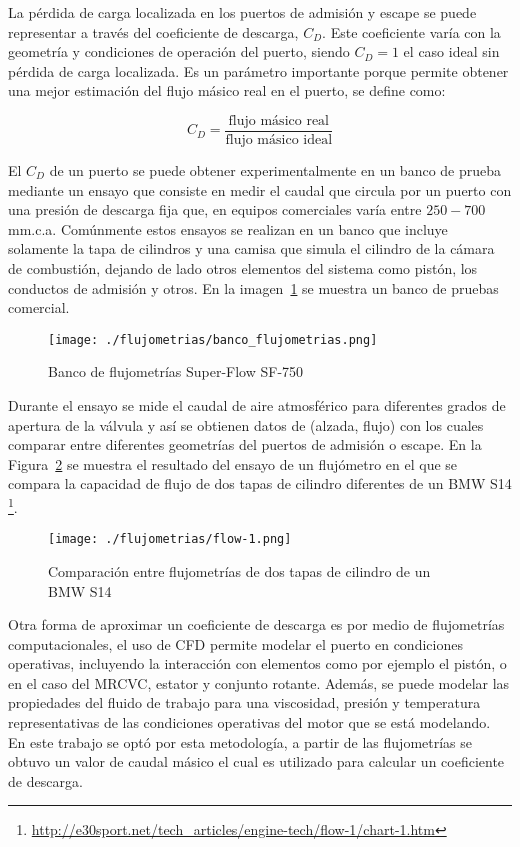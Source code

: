 La pérdida de carga localizada en los puertos de admisión y escape se puede
representar a través del coeficiente de descarga, $C_{D}$.
%
Este coeficiente varía con la geometría y condiciones de operación del puerto,
siendo $C_{D}=1$ el caso ideal sin pérdida de carga localizada.
%
Es un parámetro importante porque permite obtener una mejor estimación del flujo
másico real en el puerto, se define como:

\begin{equation}
  C_{D} = \frac{\text{flujo másico real}}{\text{flujo másico ideal}}
\end{equation}

El $C_{D}$ de un puerto se puede obtener experimentalmente en un banco de prueba
mediante un ensayo que consiste en medir el caudal que circula por un puerto con
una presión de descarga fija que, en equipos comerciales varía entre $250-700$
mm.c.a.
%
Comúnmente estos ensayos se realizan en un banco que incluye solamente la tapa
de cilindros y una camisa que simula el cilindro de la cámara de combustión,
dejando de lado otros elementos del sistema como pistón, los conductos de
admisión y otros.
%
En la imagen~\ref{fig:banco_flujometrias} se muestra un banco de pruebas
comercial.

\begin{figure} \centering
\texttt{[image: ./flujometrias/banco\_flujometrias.png]}
  \caption{Banco de flujometrías Super-Flow SF-750}\label{fig:banco_flujometrias}
\end{figure}

Durante el ensayo se mide el caudal de aire atmosférico para diferentes grados
de apertura de la válvula y así se obtienen datos de (alzada, flujo) con los
cuales comparar entre diferentes geometrías del puertos de admisión o escape.
%
En la Figura~\ref{fig:flow-1} se muestra el resultado del ensayo de un
flujómetro en el que se compara la capacidad de flujo de dos tapas de cilindro
diferentes de un BMW S14
\footnote{\url{http://e30sport.net/tech_articles/engine-tech/flow-1/chart-1.htm}}.

\begin{figure} \centering
\texttt{[image: ./flujometrias/flow-1.png]}
  \caption{Comparación entre flujometrías de dos tapas de cilindro de un BMW S14}\label{fig:flow-1}
\end{figure}

Otra forma de aproximar un coeficiente de descarga es por medio de flujometrías
computacionales, el uso de CFD permite modelar el puerto en condiciones
operativas, incluyendo la interacción con elementos como por ejemplo el pistón,
o en el caso del MRCVC, estator y conjunto rotante.
%
Además, se puede modelar las propiedades del fluido de trabajo para una
viscosidad, presión y temperatura representativas de las condiciones operativas
del motor que se está modelando.
%
En este trabajo se optó por esta metodología, a partir de las flujometrías se
obtuvo un valor de caudal másico el cual es utilizado para calcular un
coeficiente de descarga.


